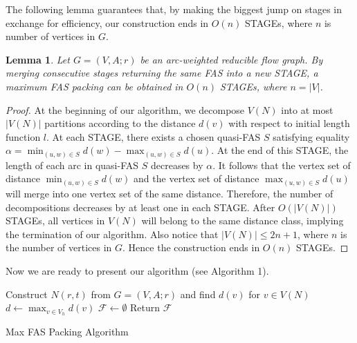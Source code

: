 \documentclass[11pt]{article}
\newtheorem{lemma}[theorem]{Lemma}
\begin{document}
The following lemma guarantees that, by making the biggest jump on stages in exchange for efficiency, our construction ends in $O(n)$ STAGEs, where $n$ is number of vertices in $G$.

\begin{lemma}
\label{lem:5}
Let $G=(V,A;r)$ be an arc-weighted reducible flow graph. By merging consecutive stages returning the same FAS into a new STAGE, a maximum FAS packing can be obtained in $O(n)$ STAGEs, where $n=\lvert V\rvert$.
\end{lemma}
\begin{proof}
At the beginning of our algorithm, we decompose $V(N)$ into at most $\lvert V(N)\rvert$ partitions according to the distance $d(v)$ with respect to initial length function $l$. At each STAGE, there exists a chosen quasi-FAS $S$ satisfying equality $\alpha=\min_{(u,w)\in S} d(w)-\max_{(u,w)\in S} d(u)$. At the end of this STAGE, the length of each arc in quasi-FAS $S$ decreases by $\alpha$. It follows that the vertex set of distance $\min_{(u,w)\in S} d(w)$ and the vertex set of distance $\max_{(u,w)\in S} d(u)$ will merge into one vertex set of the same distance. Therefore, the number of decompositions decreases by at least one in each STAGE. After $O(\lvert V(N)\rvert)$ STAGEs, all vertices in $V(N)$ will belong to the same distance class, implying the termination of our algorithm. Also notice that $\lvert V(N)\rvert\leq 2n+1$, where $n$ is the number of vertices in $G$. Hence the construction ends in $O(n)$ STAGEs.
\end{proof}
Now we are ready to present our algorithm (see Algorithm 1). 
\SetAlFnt{\small}
\begin{algorithm}[!ht]
  \SetAlgoLined
  \SetAlgoNoEnd
  \BlankLine
  Construct $N(r,t)$ from $G=(V,A;r)$ and find $d(v)$ for $v\in V(N)$\; %
  $d\leftarrow \max_{v\in V_h}d(v)$\;
  $\mathcal{F}\leftarrow \emptyset$\;
  Return $\mathcal{F}$\;
  \BlankLine
  \caption{Max FAS Packing Algorithm}
\end{algorithm} 
\end{document}
